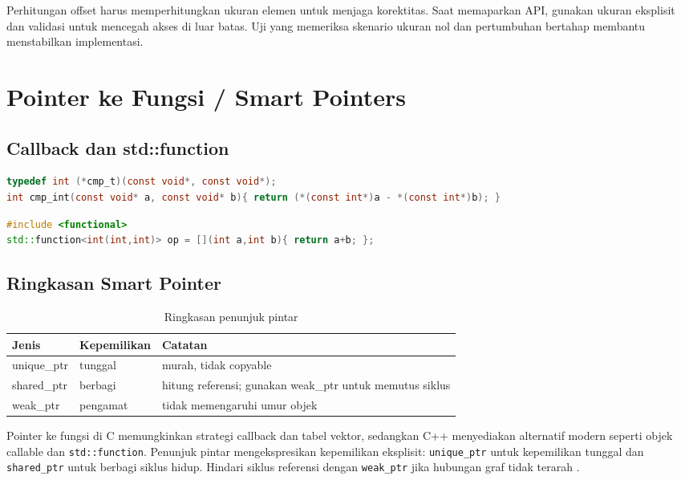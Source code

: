 \documentclass[../main.tex]{subfiles}
\begin{document}
Perhitungan offset harus memperhitungkan ukuran elemen untuk menjaga korektitas. Saat memaparkan API, gunakan ukuran eksplisit dan validasi untuk mencegah akses di luar batas. Uji yang memeriksa skenario ukuran nol dan pertumbuhan bertahap membantu menstabilkan implementasi.

\section{Pointer ke Fungsi / Smart Pointers}
\subsection{Callback dan std::function}
\begin{lstlisting}[language=C, caption={Pointer ke fungsi di C}]
typedef int (*cmp_t)(const void*, const void*);
int cmp_int(const void* a, const void* b){ return (*(const int*)a - *(const int*)b); }
\end{lstlisting}

\begin{lstlisting}[language=C++, caption={std::function dan lambda di C++}]
#include <functional>
std::function<int(int,int)> op = [](int a,int b){ return a+b; };
\end{lstlisting}

\subsection{Ringkasan Smart Pointer}
\begin{table}[h]
  \centering
  \caption{Ringkasan penunjuk pintar}
  \begin{tabular}{@{}lll@{}}
    \toprule
    Jenis & Kepemilikan & Catatan \\
    \midrule
    unique\_ptr & tunggal & murah, tidak copyable \\
    shared\_ptr & berbagi & hitung referensi; gunakan weak\_ptr untuk memutus siklus \\
    weak\_ptr & pengamat & tidak memengaruhi umur objek \\
    \bottomrule
  \end{tabular}
\end{table}
Pointer ke fungsi di C memungkinkan strategi callback dan tabel vektor, sedangkan C++ menyediakan alternatif modern seperti objek callable dan \texttt{std::function}. Penunjuk pintar mengekspresikan kepemilikan eksplisit: \texttt{unique\_ptr} untuk kepemilikan tunggal dan \texttt{shared\_ptr} untuk berbagi siklus hidup. Hindari siklus referensi dengan \texttt{weak\_ptr} jika hubungan graf tidak terarah \parencite{cpp-reference}.
\end{document}
